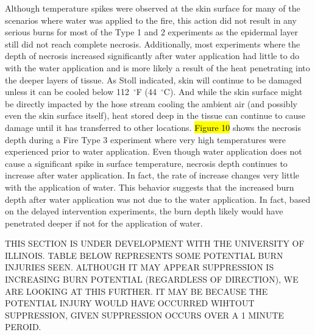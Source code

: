 \documentclass[12pt,oneside]{book}
\begin{document}
Although temperature spikes were observed at the skin surface for many of the scenarios where water was applied to the fire, this action did not result in any serious burns for most of the Type 1 and 2 experiments as the epidermal layer still did not reach complete necrosis. Additionally, most experiments where the depth of necrosis increased significantly after water application had little to do with the water application and is more likely a result of the heat penetrating into the deeper layers of tissue.  As Stoll indicated, skin will continue to be damaged unless it can be cooled below 112~$^\circ$F (44~$^\circ$C).  And while the skin surface might be directly impacted by the hose stream cooling the ambient air (and possibly even the skin surface itself), heat stored deep in the tissue can continue to cause damage until it has transferred to other locations.  \hl{Figure 10} shows the necrosis depth during a Fire Type 3 experiment where very high temperatures were experienced prior to water application.  Even though water application does not cause a significant spike in surface temperature, necrosis depth continues to increase after water application.  In fact, the rate of increase changes very little with the application of water. This behavior suggests that the increased burn depth after water application was not due to the water application. In fact, based on the delayed intervention experiments, the burn depth likely would have penetrated deeper if not for the application of water.


THIS SECTION IS UNDER DEVELOPMENT WITH THE UNIVERSITY OF ILLINOIS. TABLE BELOW REPRESENTS SOME POTENTIAL BURN INJURIES SEEN. ALTHOUGH IT MAY APPEAR SUPPRESSION IS INCREASING BURN POTENTIAL (REGARDLESS OF DIRECTION), WE ARE LOOKING AT THIS FURTHER. IT MAY BE BECAUSE THE POTENTIAL INJURY WOULD HAVE OCCURRED WIHTOUT SUPPRESSION, GIVEN SUPPRESSION OCCURS OVER A 1 MINUTE PEROID. 
\end{document}
